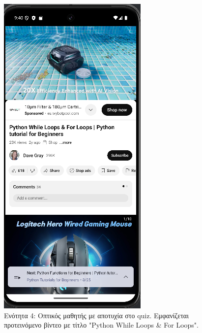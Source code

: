 \documentclass[11pt]{report}
\begin{document}
\begin{figure}[H]
  \centering
  \includegraphics[width=\linewidth, height=0.35\textheight, keepaspectratio]{Figures/εικόνα (11).png}
  \caption{Ενότητα 4: Οπτικός μαθητής με αποτυχία στο quiz. Εμφανίζεται προτεινόμενο βίντεο με τίτλο "Python While Loops \& For Loops".}
\end{figure}
\end{document}
